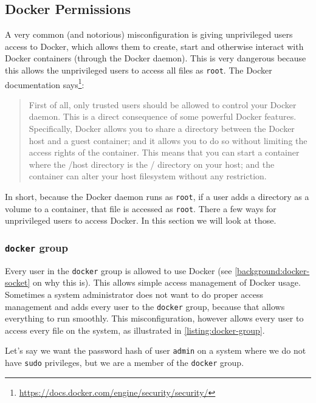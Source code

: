 \subsection{Docker Permissions}\label{subsection:docker-permissions}
A very common (and notorious) misconfiguration is giving unprivileged users access to Docker, which allows them to create, start and otherwise interact with Docker containers (through the Docker daemon). This is very dangerous because this allows the unprivileged users to access all files as \lstinline{root}. The Docker documentation says\footnote{\url{https://docs.docker.com/engine/security/security/}}:
\begin{quote}
First of all, only trusted users should be allowed to control your Docker daemon. This is a direct consequence of some powerful Docker features. Specifically, Docker allows you to share a directory between the Docker host and a guest container; and it allows you to do so without limiting the access rights of the container. This means that you can start a container where the /host directory is the / directory on your host; and the container can alter your host filesystem without any restriction.
\end{quote}

In short, because the Docker daemon runs as \lstinline{root}, if a user adds a directory as a volume to a container, that file is accessed as \lstinline{root}. There a few ways for unprivileged users to access Docker. In this section we will look at those.

\subsubsection{\texorpdfstring{\lstinline{docker}}{docker} group}
Every user in the \lstinline{docker} group is allowed to use Docker (see \autoref{background:docker-socket} on why this is). This allows simple access management of Docker usage. Sometimes a system administrator does not want to do proper access management and adds every user to the \lstinline{docker} group, because that allows everything to run smoothly. This misconfiguration, however allows every user to access every file on the system, as illustrated in \autoref{listing:docker-group}.

\medskip

Let's say we want the password hash of user \lstinline{admin} on a system where we do not have \lstinline{sudo} privileges, but we are a member of the \lstinline{docker} group.

